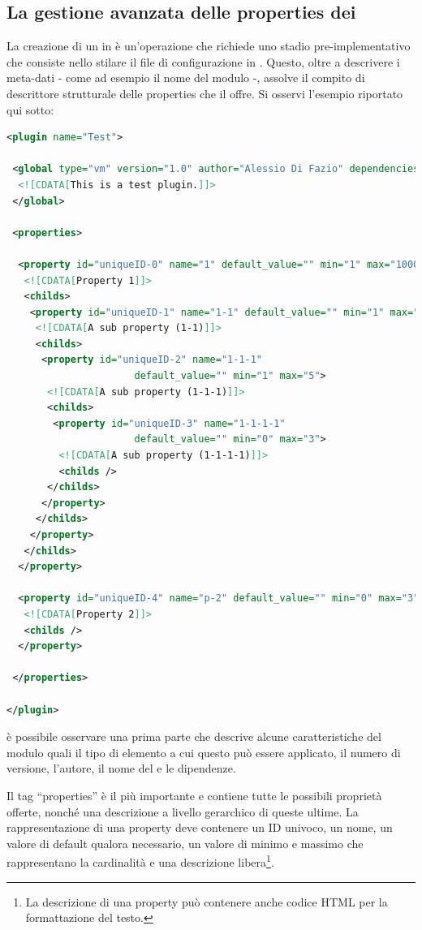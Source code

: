 \subsection{La gestione avanzata delle properties dei \plugin{}}
La creazione di un \plugin{} in \visualnetkit{} è un'operazione che richiede uno stadio pre-implementativo che consiste nello stilare il file di configurazione in \xml{}. Questo, oltre a descrivere i meta-dati - come ad esempio il nome del modulo -, assolve il compito di descrittore strutturale delle properties che il \plugin{} offre.
Si osservi l'esempio riportato qui sotto:
\begin{lstlisting}[language=xml]
<plugin name="Test">
 
 <global type="vm" version="1.0" author="Alessio Di Fazio" dependencies="">
  <![CDATA[This is a test plugin.]]>
 </global>
 
 <properties>
  
  <property id="uniqueID-0" name="1" default_value="" min="1" max="1000">
   <![CDATA[Property 1]]>
   <childs>
    <property id="uniqueID-1" name="1-1" default_value="" min="1" max="2">
     <![CDATA[A sub property (1-1)]]>
     <childs>
      <property id="uniqueID-2" name="1-1-1"
                      default_value="" min="1" max="5">
       <![CDATA[A sub property (1-1-1)]]>
       <childs>
        <property id="uniqueID-3" name="1-1-1-1"
                      default_value="" min="0" max="3">
         <![CDATA[A sub property (1-1-1-1)]]>
         <childs />
       </childs>
      </property>
     </childs>
    </property> 
   </childs>
  </property>
  
  <property id="uniqueID-4" name="p-2" default_value="" min="0" max="3">
   <![CDATA[Property 2]]>
   <childs />
  </property>
  
 </properties>
 
</plugin>
\end{lstlisting}
è possibile osservare una prima parte che descrive alcune caratteristiche del modulo quali il tipo di elemento a cui questo può essere applicato, il numero di versione, l'autore, il nome del \plugin{} e le dipendenze.

Il tag ``properties'' è il più importante e contiene tutte le possibili proprietà offerte, nonché una descrizione a livello gerarchico di queste ultime. La rappresentazione di una property deve contenere un ID univoco, un nome, un valore di default qualora necessario, un valore di minimo e massimo che rappresentano la cardinalità e una descrizione libera\footnote{La descrizione di una property può contenere anche codice HTML per la formattazione del testo.}.

